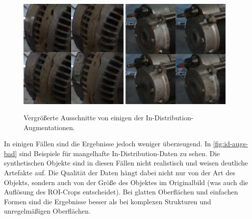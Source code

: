 \begin{figure}
	\centering
	\includegraphics[width=0.48\textwidth]{figure_results_id-augs_good_1.png}%
	\hspace{0.02\textwidth}\includegraphics[width=0.48\textwidth]{figure_results_id-augs_good_2.png}
	\caption{Vergrößerte Ausschnitte von einigen der In-Distribution-Augmentationen.}
	\label{fig:id-augs-good}
\end{figure}

In einigen Fällen sind die Ergebnisse jedoch weniger überzeugend. In \autoref{fig:id-augs-bad} sind Beispiele für mangelhafte In-Distribution-Daten zu sehen. Die synthetischen Objekte sind in diesen Fällen nicht realistisch und weisen deutliche Artefakte auf. Die Qualität der Daten hängt dabei nicht nur von der Art des Objekts, sondern auch von der Größe des Objektes im Originalbild (was auch die Auflösung des ROI-Crops entscheidet). Bei glatten Oberflächen und einfachen Formen sind die Ergebnisse besser als bei komplexen Strukturen und unregelmäßigen Oberflächen.

